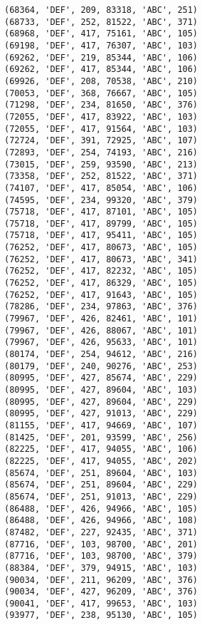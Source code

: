 \begin{verbatim}
(68364, 'DEF', 209, 83318, 'ABC', 251)
(68733, 'DEF', 252, 81522, 'ABC', 371)
(68968, 'DEF', 417, 75161, 'ABC', 105)
(69198, 'DEF', 417, 76307, 'ABC', 103)
(69262, 'DEF', 219, 85344, 'ABC', 106)
(69262, 'DEF', 417, 85344, 'ABC', 106)
(69926, 'DEF', 208, 70538, 'ABC', 210)
(70053, 'DEF', 368, 76667, 'ABC', 105)
(71298, 'DEF', 234, 81650, 'ABC', 376)
(72055, 'DEF', 417, 83922, 'ABC', 103)
(72055, 'DEF', 417, 91564, 'ABC', 103)
(72724, 'DEF', 391, 72925, 'ABC', 107)
(72893, 'DEF', 254, 74193, 'ABC', 216)
(73015, 'DEF', 259, 93590, 'ABC', 213)
(73358, 'DEF', 252, 81522, 'ABC', 371)
(74107, 'DEF', 417, 85054, 'ABC', 106)
(74595, 'DEF', 234, 99320, 'ABC', 379)
(75718, 'DEF', 417, 87101, 'ABC', 105)
(75718, 'DEF', 417, 89799, 'ABC', 105)
(75718, 'DEF', 417, 95411, 'ABC', 105)
(76252, 'DEF', 417, 80673, 'ABC', 105)
(76252, 'DEF', 417, 80673, 'ABC', 341)
(76252, 'DEF', 417, 82232, 'ABC', 105)
(76252, 'DEF', 417, 86329, 'ABC', 105)
(76252, 'DEF', 417, 91643, 'ABC', 105)
(78286, 'DEF', 234, 97863, 'ABC', 376)
(79967, 'DEF', 426, 82461, 'ABC', 101)
(79967, 'DEF', 426, 88067, 'ABC', 101)
(79967, 'DEF', 426, 95633, 'ABC', 101)
(80174, 'DEF', 254, 94612, 'ABC', 216)
(80179, 'DEF', 240, 90276, 'ABC', 253)
(80995, 'DEF', 427, 85674, 'ABC', 229)
(80995, 'DEF', 427, 89604, 'ABC', 103)
(80995, 'DEF', 427, 89604, 'ABC', 229)
(80995, 'DEF', 427, 91013, 'ABC', 229)
(81155, 'DEF', 417, 94669, 'ABC', 107)
(81425, 'DEF', 201, 93599, 'ABC', 256)
(82225, 'DEF', 417, 94055, 'ABC', 106)
(82225, 'DEF', 417, 94055, 'ABC', 202)
(85674, 'DEF', 251, 89604, 'ABC', 103)
(85674, 'DEF', 251, 89604, 'ABC', 229)
(85674, 'DEF', 251, 91013, 'ABC', 229)
(86488, 'DEF', 426, 94966, 'ABC', 105)
(86488, 'DEF', 426, 94966, 'ABC', 108)
(87482, 'DEF', 227, 92435, 'ABC', 371)
(87716, 'DEF', 103, 98700, 'ABC', 201)
(87716, 'DEF', 103, 98700, 'ABC', 379)
(88384, 'DEF', 379, 94915, 'ABC', 103)
(90034, 'DEF', 211, 96209, 'ABC', 376)
(90034, 'DEF', 427, 96209, 'ABC', 376)
(90041, 'DEF', 417, 99653, 'ABC', 103)
(93977, 'DEF', 238, 95130, 'ABC', 105)

\end{verbatim}
